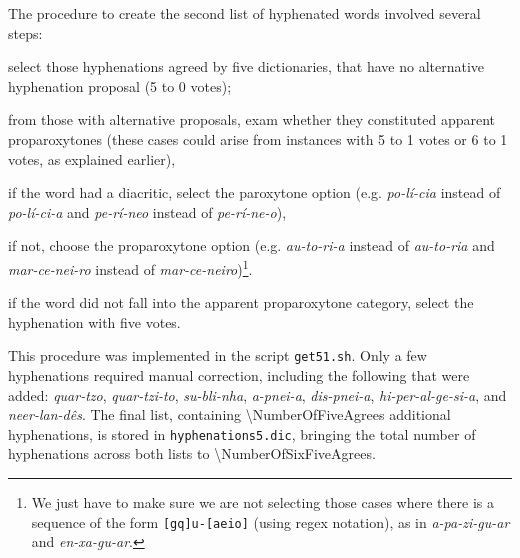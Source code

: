The procedure to create the second list of hyphenated words involved several steps:
\begin{enumerate*}[label=\arabic*)]
  \item select those hyphenations agreed by five dictionaries, that have no alternative hyphenation proposal (5 to 0 votes);
  \item from those with alternative proposals, exam whether they constituted apparent proparoxytones (these cases could arise from instances with 5 to 1 votes or 6 to 1 votes, as explained earlier), 
      \begin{enumerate*}[label=\alph*)]
	  \item if the word had a diacritic, select the paroxytone option (e.g. \emph{po-lí-cia} instead of \emph{po-lí-ci-a} and \emph{pe-rí-neo} instead of \emph{pe-rí-ne-o}),
	  \item if not, choose the proparoxytone option (e.g. \emph{au-to-ri-a} instead of \emph{au-to-ria} and \emph{mar-ce-nei-ro} instead of \emph{mar-ce-neiro})\footnote{We just have to make sure we are not selecting those cases where there is a sequence of the form \texttt{[gq]u-[aeio]} (using regex notation), as in \emph{a-pa-zi-gu-ar} and \emph{en-xa-gu-ar}.}.
      \end{enumerate*}
  \item if the word did not fall into the apparent proparoxytone category, select the hyphenation with five votes.
\end{enumerate*}
This procedure was implemented in the script \texttt{get51.sh}. 
Only a few hyphenations required manual correction, including the following that were added:
\emph{quar-tzo}, \emph{quar-tzi-to}, \emph{su-bli-nha}, \emph{a-pnei-a}, \emph{dis-pnei-a}, 
\emph{hi-per-al-ge-si-a}, and \emph{neer-lan-dês}.
The final list, containing \num{\NumberOfFiveAgrees} additional hyphenations, is stored in \texttt{hyphenations5.dic}, 
bringing the total number of hyphenations across both lists to \num{\NumberOfSixFiveAgrees}.



